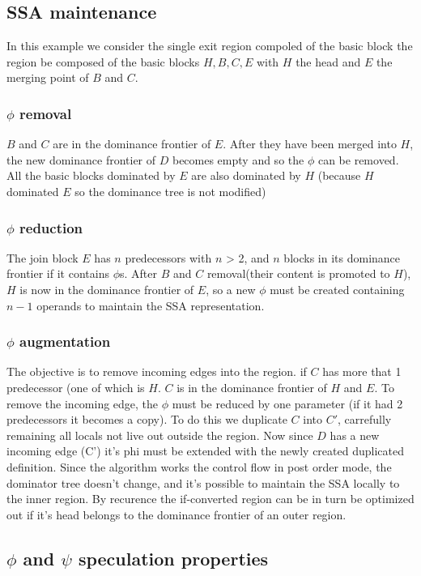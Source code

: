     \subsection{SSA maintenance}

In this example we consider the single exit region compoled of the basic block the region be composed of the basic blocks ${H, B, C, E}$ with $H$ the head and $E$ the merging point of $B$ and $C$. 

    \subsubsection{$\phi$ removal} 
$B$ and $C$ are in the dominance frontier of $E$. After they have been merged into $H$, the new dominance frontier of $D$ becomes empty and so the $\phi$ can be removed. All the basic blocks dominated by $E$ are also dominated by $H$ (because $H$ dominated $E$ so the dominance tree is not modified)
    \subsubsection{$\phi$ reduction} 
The join block $E$ has $n$ predecessors with $n$ > 2, and $n$ blocks in its dominance frontier if it contains $\phi$s. After $B$ and $C$ removal(their content is promoted to $H$), $H$ is now in the dominance frontier of $E$, so a new $\phi$ must be created containing $n-1$ operands to maintain the SSA representation.
    \subsubsection{$\phi$ augmentation} 
The objective is to remove incoming edges into the region. if $C$ has more that 1 predecessor (one of which is $H$. $C$ is in the dominance frontier of $H$ and $E$. To remove the incoming edge, the $\phi$ must be reduced by one parameter (if it had 2 predecessors it becomes a copy). To do this we duplicate $C$ into $C'$, carrefully remaining all locals not live out outside the region. Now since $D$ has a new incoming edge (C') it's phi must be extended with the newly created duplicated definition. 
Since the algorithm works the control flow in post order mode, the dominator tree doesn't change, and it's possible to maintain the SSA locally to the inner region. By recurence the if-converted region can be in turn be optimized out if it's head belongs to the dominance frontier of an outer region.

    \subsection{$\phi$ and $\psi$ speculation properties}

